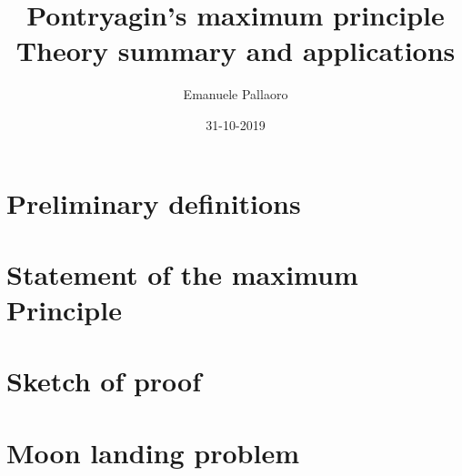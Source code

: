 \documentclass[14pt, margin=2pt]{article}
\title{%
	Pontryagin's maximum principle\\
	\large Theory summary and applications
}
\author{Emanuele Pallaoro}
\date{31-10-2019}
\numberwithin{equation}{section}
\begin{document}
\maketitle
\pagestyle{plain}

\newtheorem{teo}{Theorem}[subsection]
\newtheorem*{cor}{Corollary}


\section{Preliminary definitions}

\section{Statement of the maximum Principle}

\section{Sketch of proof}


\clearpage
\section{Moon landing problem}
\end{document}
